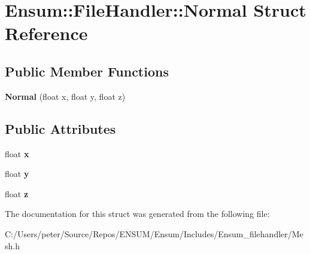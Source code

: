 \hypertarget{struct_ensum_1_1_file_handler_1_1_normal}{}\section{Ensum\+:\+:File\+Handler\+:\+:Normal Struct Reference}
\label{struct_ensum_1_1_file_handler_1_1_normal}
\subsection*{Public Member Functions}
\begin{DoxyCompactItemize}
\item 
{\bfseries Normal} (float x, float y, float z)\hypertarget{struct_ensum_1_1_file_handler_1_1_normal_adca8172078729f3e4803e0815804f44a}{}\label{struct_ensum_1_1_file_handler_1_1_normal_adca8172078729f3e4803e0815804f44a}

\end{DoxyCompactItemize}
\subsection*{Public Attributes}
\begin{DoxyCompactItemize}
\item 
float {\bfseries x}\hypertarget{struct_ensum_1_1_file_handler_1_1_normal_a4688ba702c53c978c6f3a581d80c24e2}{}\label{struct_ensum_1_1_file_handler_1_1_normal_a4688ba702c53c978c6f3a581d80c24e2}

\item 
float {\bfseries y}\hypertarget{struct_ensum_1_1_file_handler_1_1_normal_aa392a1dd171ff86ef4c537c9ea4c8fda}{}\label{struct_ensum_1_1_file_handler_1_1_normal_aa392a1dd171ff86ef4c537c9ea4c8fda}

\item 
float {\bfseries z}\hypertarget{struct_ensum_1_1_file_handler_1_1_normal_a1df535481db8e52b93f0b365313c2ca2}{}\label{struct_ensum_1_1_file_handler_1_1_normal_a1df535481db8e52b93f0b365313c2ca2}

\end{DoxyCompactItemize}


The documentation for this struct was generated from the following file\+:\begin{DoxyCompactItemize}
\item 
C\+:/\+Users/peter/\+Source/\+Repos/\+E\+N\+S\+U\+M/\+Ensum/\+Includes/\+Ensum\+\_\+filehandler/Mesh.\+h\end{DoxyCompactItemize}
